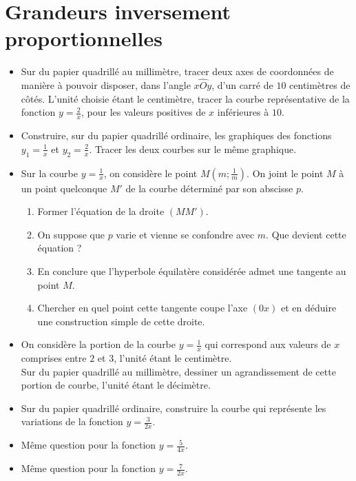 \documentclass[12 pt]{report}
\theoremstyle{plain}
\newcounter{n}
\renewcommand{\it}{\item[$\mathbf{\then}.$]\stepcounter{n} }
\begin{document}
 \chapter{Grandeurs inversement proportionnelles}
 \begin{itemize}
 \it Sur du papier quadrillé au millimètre, tracer deux axes de coordonnées de manière à pouvoir disposer, dans l'angle $\widehat{xOy}$, d'un carré de $10$ centimètres de côtés. L'unité choisie étant le centimètre, tracer la courbe représentative de la fonction $y=\frac2x$, pour les valeurs positives de $x$ inférieures à $10$. 
 \it Construire, sur du papier quadrillé ordinaire, les graphiques des fonctions $y_1=\frac1x$ et $y_2=\frac2x$. Tracer les deux courbes sur le même graphique. 
 \it Sur la courbe $y=\frac1x$, on considère le point $M(m;\frac1m)$. On joint le point $M$ à un point quelconque $M'$ de la courbe déterminé par son abscisse $p$. \begin{enumerate}
 \item Former l'équation de la droite $(MM')$. 
 \item On suppose que $p$ varie et vienne se confondre avec $m$. Que devient cette équation ? 
 \item En conclure que l'hyperbole équilatère considérée admet une tangente au point $M$. 
 \item Chercher en quel point cette tangente coupe l'axe $(0x)$ et
 en déduire une construction simple de cette droite. 
 \end{enumerate}
 \it On considère la portion de la courbe $y=\frac1x$ qui correspond
 aux valeurs de $x$ comprises entre $2$ et $3$, l'unité étant le centimètre. \\Sur du papier quadrillé au millimètre, dessiner un agrandissement de cette portion de courbe, l'unité étant le décimètre.
 \it Sur du papier quadrillé ordinaire, construire la courbe qui représente les variations de la fonction $y=\frac3{2x}$.
 \it Même question pour la fonction $y = \frac5{4x}$.
 \it Même question pour la fonction $y= \frac7{2x}$. 
 \end{itemize}
\end{document}
